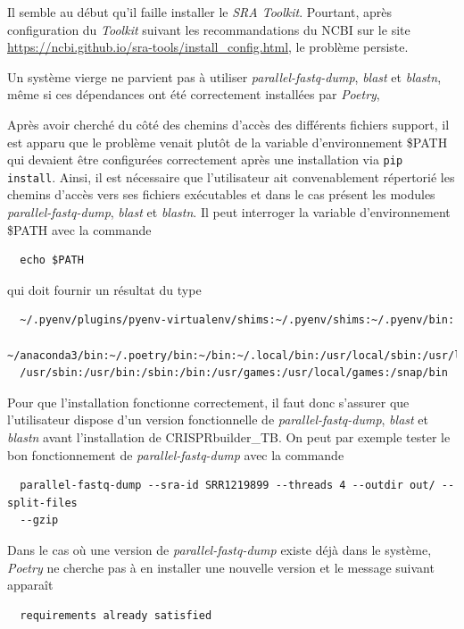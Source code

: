 \documentclass[twoside,a4paper,11pt,frenchb,openany]{report}
\begin{document}
Il semble au début qu'il faille installer le \textit{SRA Toolkit}. Pourtant, après configuration du \textit{Toolkit} suivant les recommandations du NCBI sur le site \url{https://ncbi.github.io/sra-tools/install_config.html}, le problème persiste.

Un système vierge ne parvient pas à utiliser \textit{parallel-fastq-dump}, \textit{blast} et \textit{blastn}, même si ces dépendances ont été correctement installées par \textit{Poetry}, 

Après avoir cherché du côté des chemins d'accès des différents fichiers support, il est apparu que le problème venait plutôt de la variable d'environnement \$PATH qui devaient être configurées correctement après une installation via \texttt{pip install}. Ainsi, il est nécessaire que l'utilisateur ait convenablement répertorié les chemins d'accès vers ses fichiers exécutables et dans le cas présent les modules \textit{parallel-fastq-dump}, \textit{blast} et \textit{blastn}. Il peut interroger la variable d'environnement \$PATH avec la commande

\begin{verbatim}
  echo $PATH
\end{verbatim}

qui doit fournir un résultat du type
\begin{verbatim}
  ~/.pyenv/plugins/pyenv-virtualenv/shims:~/.pyenv/shims:~/.pyenv/bin:
  ~/anaconda3/bin:~/.poetry/bin:~/bin:~/.local/bin:/usr/local/sbin:/usr/local/bin:
  /usr/sbin:/usr/bin:/sbin:/bin:/usr/games:/usr/local/games:/snap/bin
\end{verbatim}

Pour que l'installation fonctionne correctement, il faut donc s'assurer que l'utilisateur dispose d'un version fonctionnelle de \textit{parallel-fastq-dump}, \textit{blast} et \textit{blastn} avant l'installation de CRISPRbuilder\_TB. On peut par exemple tester le bon fonctionnement de \textit{parallel-fastq-dump} avec la commande 

\begin{verbatim}
  parallel-fastq-dump --sra-id SRR1219899 --threads 4 --outdir out/ --split-files 
  --gzip
\end{verbatim} 

Dans le cas où une version de \textit{parallel-fastq-dump} existe déjà dans le système, \textit{Poetry} ne cherche pas à en installer une nouvelle version et le message suivant apparaît

\begin{verbatim}
  requirements already satisfied
\end{verbatim}
\end{document}
